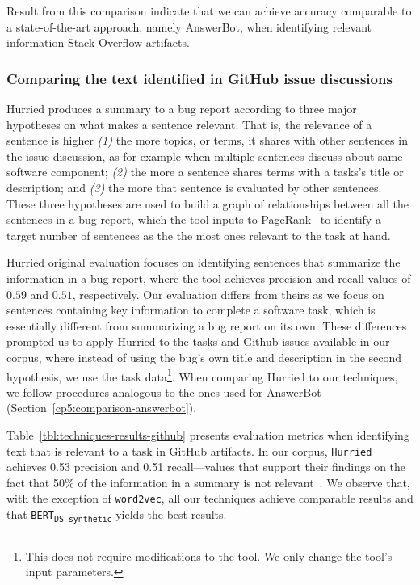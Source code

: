 Result from this comparison indicate that we can achieve accuracy comparable  
to a state-of-the-art approach, namely AnswerBot, 
when identifying relevant information Stack Overflow artifacts.






\subsubsection{Comparing the text identified in GitHub issue discussions}
\label{cp5:comparison-hurried}


\acs{Hurried} produces a summary to a bug report according to three major hypotheses on what makes a sentence relevant. 
That is, the relevance of a sentence is higher 
\textit{(1)} the more topics, or terms, it shares with other sentences  in the issue discussion, as for example when multiple sentences discuss about same software component;
\textit{(2)} the more a sentence shares terms with a tasks's title or description; and 
\textit{(3)} the more that sentence is evaluated by other sentences.
These three hypotheses are used to build a graph of relationships between all the sentences in a bug report, which 
the tool inputs to PageRank~\cite{Page1999} to identify a target number of sentences as the the most 
ones relevant to the task at hand. 



\acs{Hurried} original evaluation focuses on identifying sentences that summarize the information in a bug report, where the tool achieves precision and recall values of $0.59$ and $0.51$, respectively.
Our evaluation differs from theirs as we focus on sentences containing key information to complete a software task, which is essentially different from summarizing a bug report on its own. These differences prompted us to 
apply \acs{Hurried} to the tasks and Github issues available in our corpus, where instead of using the bug's own title and description in the second hypothesis, we use the task data\footnote{This does not require modifications to the tool. We only change the tool's input parameters.}. When comparing \acs{Hurried} to our techniques, we follow procedures analogous to the ones used for AnswerBot (Section~\ref{cp5:comparison-answerbot}).



Table~\ref{tbl:techniques-results-github} presents evaluation metrics when identifying text that is relevant to a task 
in GitHub artifacts. In our corpus, \texttt{Hurried} achieves 0.53 precision and 0.51 recall---values that support their findings on the fact that 50\% of the information in a summary is not relevant~\cite{Lotufo2012}.
We observe that, with the exception of \texttt{word2vec}, all our techniques achieve comparable results
and that \texttt{BERT\textsubscript{DS-synthetic}} yields the best results. 




